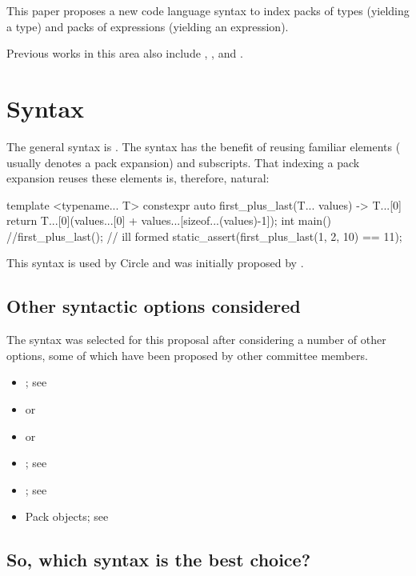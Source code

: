 \documentclass{wg21}
\begin{document}
This paper proposes a new code language syntax to index packs of types (yielding a type) and packs of expressions (yielding an expression).

Previous works in this area also include , ,  and .

\section{Syntax}

The general syntax is .
The syntax has the benefit of reusing familiar elements ( usually denotes a pack expansion) and \tcode{[]} subscripts.
That indexing a pack expansion reuses these elements is, therefore, natural:

\begin{colorblock}
template <typename... T>
constexpr auto first_plus_last(T... values) ->  T...[0] {
    return T...[0](values...[0] + values...[sizeof...(values)-1]);
}
int main() {
    //first_plus_last(); // ill formed
    static_assert(first_plus_last(1, 2, 10) == 11);
}
\end{colorblock}

This syntax is used by Circle and was initially proposed by .

\subsection{Other syntactic options considered}

The 
syntax was selected for this proposal after considering a
number of other options, some of which have been proposed by other
committee members.
\begin{itemize}
\item {}; see 
\item {} or 
\item {} or 
\item {}; see 
\item {}; see 
\item Pack objects; see 
\end{itemize}

\subsection{So, which syntax is the best choice?}
\end{document}
